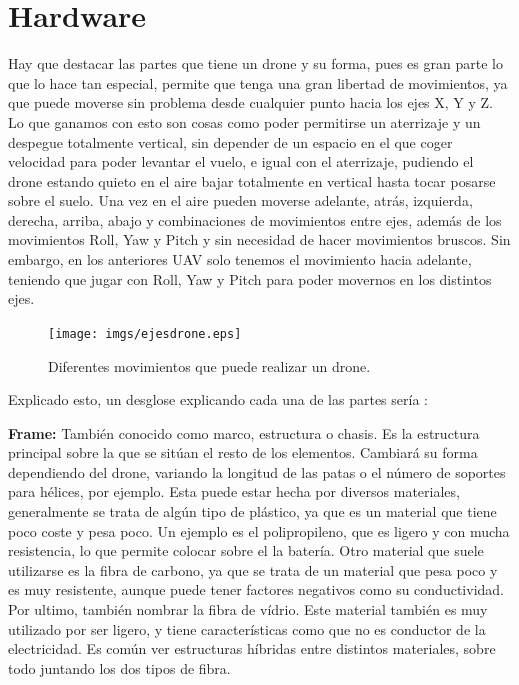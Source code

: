 \section{Hardware}
\hspace{1 cm} Hay que destacar las partes que tiene un drone y su forma, pues es gran parte lo que lo hace tan especial, permite que tenga una gran libertad de movimientos, ya que puede moverse sin problema desde cualquier punto hacia los ejes X, Y y Z. Lo que ganamos con esto son cosas como poder permitirse un aterrizaje y un despegue totalmente vertical, sin depender de un espacio en el que coger velocidad para poder levantar el vuelo, e igual con el aterrizaje, pudiendo el drone estando quieto en el aire bajar totalmente en vertical hasta tocar posarse sobre el suelo. Una vez en el aire pueden moverse adelante, atr\'as, izquierda, derecha, arriba, abajo y combinaciones de movimientos entre ejes, adem\'as de los movimientos Roll, Yaw y Pitch y sin necesidad de hacer movimientos bruscos. Sin embargo, en los anteriores UAV solo tenemos el movimiento hacia adelante, teniendo que jugar con Roll, Yaw y Pitch para poder movernos en los distintos ejes.

\begin{figure}[ht]
	\centering
		\texttt{[image: imgs/ejesdrone.eps]}
		\caption{Diferentes movimientos que puede realizar un drone.}
	\label{fig:ejesdrone}
\end{figure}

\hspace{1 cm} Explicado esto, un desglose explicando cada una de las partes ser\'ia :

\hspace{1 cm}\textbf{Frame:} Tambi\'en conocido como marco, estructura o chasis. Es la estructura principal sobre la que se sit\'uan el resto de los elementos. Cambiar\'a su forma dependiendo del drone, variando la longitud de las patas o el n\'umero de soportes para h\'elices, por ejemplo. Esta puede estar hecha por diversos materiales, generalmente se trata de alg\'un tipo de pl\'astico, ya que es un material que tiene poco coste y pesa poco. Un ejemplo es el polipropileno, que es ligero y con mucha resistencia, lo que permite colocar sobre el la bater\'ia. Otro material que suele utilizarse es la fibra de carbono, ya que se trata de un material que pesa poco y es muy resistente, aunque puede tener factores negativos como su conductividad. Por ultimo, tambi\'en nombrar la fibra de v\'idrio. Este material tambi\'en es muy utilizado por ser ligero, y tiene caracter\'isticas como que no es conductor de la electricidad. Es com\'un ver estructuras h\'ibridas entre distintos materiales, sobre todo juntando los dos tipos de fibra. 

